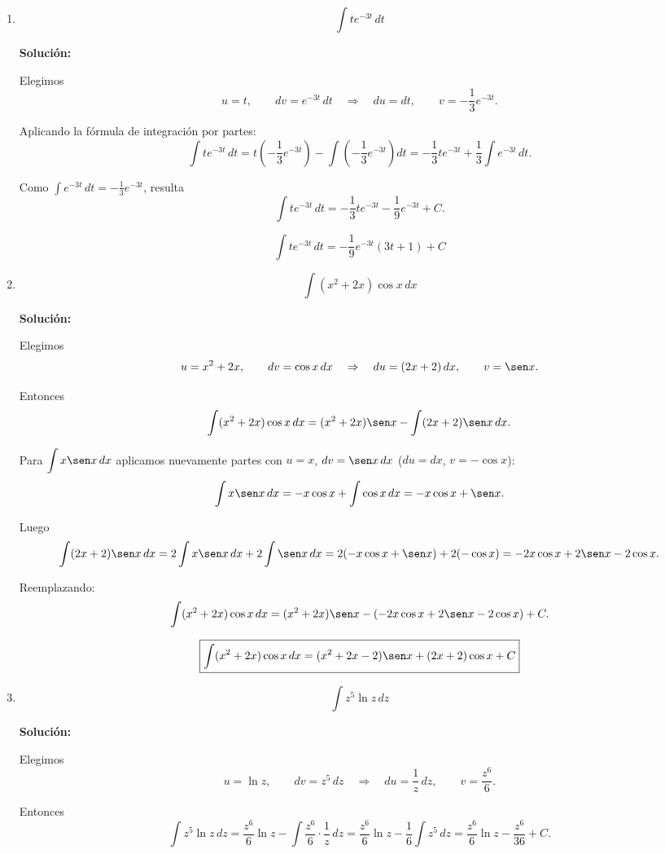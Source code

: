 \documentclass[12pt]{article}
\newcommand{\solucion}{%
    \vspace{0.8em}%
    \textbf{Solución:}%
}
\begin{document}
\begin{enumerate}[label=\alph*.-]

    \item
    \[
    \int t e^{-3t}\,dt
    \]

    \solucion

    Elegimos
    \[
    u=t,\qquad dv=e^{-3t}\,dt
    \quad\Rightarrow\quad
    du=dt,\qquad v=-\frac13e^{-3t}.
    \]

    Aplicando la fórmula de integración por partes:
    \[
    \int t e^{-3t}\,dt
    =t\left(-\frac13e^{-3t}\right)-\int\left(-\frac13e^{-3t}\right)dt
    =-\frac13te^{-3t}+\frac13\int e^{-3t}\,dt.
    \]

    Como $\displaystyle\int e^{-3t}\,dt=-\frac13e^{-3t}$, resulta
    \[
    \int t e^{-3t}\,dt=-\frac13te^{-3t}-\frac19e^{-3t}+C.
    \]

    \[
    \boxed{
    \int t e^{-3t}\,dt=-\frac19e^{-3t}(3t+1)+C
    }
    \]


    \item
    \[
    \int(x^2+2x)\cos x\,dx
    \]

    \solucion

    Elegimos
    \[
    u=x^2+2x,\qquad dv=\cos x\,dx
    \quad\Rightarrow\quad
    du=(2x+2)\,dx,\qquad v=\sen x.
    \]

    Entonces
    \[
    \int(x^2+2x)\cos x\,dx
    =(x^2+2x)\sen x-\int(2x+2)\sen x\,dx.
    \]

    Para $\displaystyle\int x\sen x\,dx$ aplicamos nuevamente partes con
    $u=x$, $dv=\sen x\,dx$ ($du=dx$, $v=-\cos x$):
    \[
    \int x\sen x\,dx=-x\cos x+\int\cos x\,dx=-x\cos x+\sen x.
    \]

    Luego
    \[
    \int(2x+2)\sen x\,dx
    =2\int x\sen x\,dx+2\int\sen x\,dx
    =2(-x\cos x+\sen x)+2(-\cos x)
    =-2x\cos x+2\sen x-2\cos x.
    \]

    Reemplazando:
    \[
    \int(x^2+2x)\cos x\,dx
    =(x^2+2x)\sen x-\left(-2x\cos x+2\sen x-2\cos x\right)+C.
    \]

    \[
    \boxed{
    \int(x^2+2x)\cos x\,dx=(x^2+2x-2)\sen x+(2x+2)\cos x+C
    }
    \]


    \item
    \[
    \int z^5\ln z\,dz
    \]

    \solucion

    Elegimos
    \[
    u=\ln z,\qquad dv=z^5\,dz
    \quad\Rightarrow\quad
    du=\frac{1}{z}\,dz,\qquad v=\frac{z^6}{6}.
    \]

    Entonces
    \[
    \int z^5\ln z\,dz
    =\frac{z^6}{6}\ln z-\int\frac{z^6}{6}\cdot\frac{1}{z}\,dz
    =\frac{z^6}{6}\ln z-\frac16\int z^5\,dz
    =\frac{z^6}{6}\ln z-\frac{z^6}{36}+C.
    \]


\end{enumerate}
\end{document}
